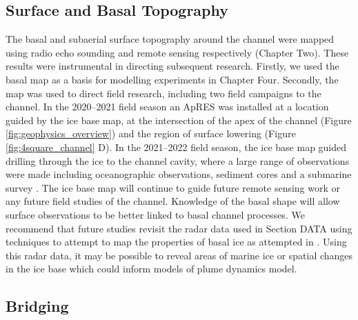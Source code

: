 \subsection{Surface and Basal Topography}

The basal and subaerial surface topography around the channel were mapped using radio echo sounding and remote sensing respectively (Chapter Two).  
These results were instrumental in directing subsequent research. Firstly, we used the basal map as a basis for modelling experiments in Chapter Four. Secondly, the map was used to direct field research, including two field campaigns to the channel. In the 2020--2021 field season an ApRES was installed at a location guided by the ice base map, at the intersection of the apex of the channel (Figure \ref{fig:geophysics_overview}) and the region of surface lowering (Figure \ref{fig:4square_channel} D). In the 2021--2022 field season, the ice base map guided drilling through the ice to the channel cavity, where a large range of observations were made including oceanographic observations, sediment cores and a submarine survey \citep{horgan2022channel}. The ice base map will continue to guide future remote sensing work or any future field studies of the channel. Knowledge of the basal shape will allow surface observations to be better linked to basal channel processes. 
We recommend that future studies revisit the radar data used in Section DATA using techniques to attempt to map the properties of basal ice as attempted in \cite{macgregor2011grounding}. Using this radar data, it may be possible to reveal areas of marine ice or spatial changes in the ice base which could inform models of plume dynamics model.

\subsection{Bridging}

